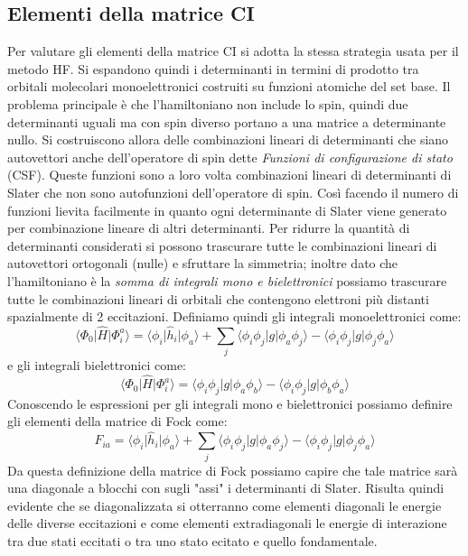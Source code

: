 \documentclass[oneside]{amsbook}
\numberwithin{section}{chapter}
\numberwithin{equation}{section}
\numberwithin{figure}{section}
\begin{document}
\subsection{Elementi della matrice CI}
Per valutare gli elementi della matrice CI si adotta la stessa strategia usata per il metodo HF. Si espandono quindi i determinanti in termini di prodotto tra orbitali molecolari monoelettronici costruiti su funzioni atomiche del set base. Il problema principale è che l'hamiltoniano non include lo spin, quindi due determinanti uguali ma con spin diverso portano a una matrice a determinante nullo. Si costruiscono allora delle combinazioni lineari di determinanti che siano autovettori anche dell'operatore di spin dette \emph{Funzioni di configurazione di stato} (CSF). Queste funzioni sono a loro volta combinazioni lineari di determinanti di Slater che non sono autofunzioni dell'operatore di spin. Così facendo il numero di funzioni lievita facilmente in quanto ogni determinante di Slater viene generato per combinazione lineare di altri determinanti. Per ridurre la quantità di determinanti considerati si possono trascurare tutte le combinazioni lineari di autovettori ortogonali (nulle) e sfruttare la simmetria; inoltre dato che l'hamiltoniano è la \emph{somma di integrali mono e bielettronici} possiamo trascurare tutte le combinazioni lineari di orbitali che contengono elettroni più distanti spazialmente di 2 eccitazioni.
Definiamo quindi gli integrali monoelettronici come:
\begin{equation}
 \langle \Phi_{0}\vert \hat{H}\vert\Phi^{a}_i\rangle=\langle \phi_{i}\vert \hat{h}_i\vert\phi_{a}\rangle + \sum \limits _{j} \langle\phi_{i}\phi_j\vert g \vert\phi_{a}\phi_j\rangle-\langle\phi_{i}\phi_j\vert g \vert\phi_j\phi_{a}\rangle
\end{equation}
e gli integrali bielettronici come:
\begin{equation}
 \langle \Phi_{0}\vert \hat{H}\vert\Phi^{a}_i\rangle= \langle\phi_{i}\phi_j\vert g \vert\phi_{a}\phi_b\rangle-\langle\phi_{i}\phi_j\vert g \vert\phi_b \phi_{a}\rangle
\end{equation}
Conoscendo le espressioni per gli integrali mono e bielettronici possiamo definire gli elementi della matrice di Fock come: 
\begin{equation}
F_{ia}=\langle \phi_{i}\vert \hat{h}_i\vert\phi_{a}\rangle + \sum \limits _{j} \langle\phi_{i}\phi_j\vert g \vert\phi_{a}\phi_j\rangle-\langle\phi_{i}\phi_j\vert g \vert\phi_j\phi_{a}\rangle
\end{equation}
Da questa definizione della matrice di Fock possiamo capire che tale matrice sarà una diagonale a blocchi con sugli "assi" i determinanti di Slater. Risulta quindi evidente che se diagonalizzata si otterranno come elementi diagonali le energie delle diverse eccitazioni e come elementi extradiagonali le energie di interazione tra due stati eccitati o tra uno stato ecitato e quello fondamentale.
\end{document}
